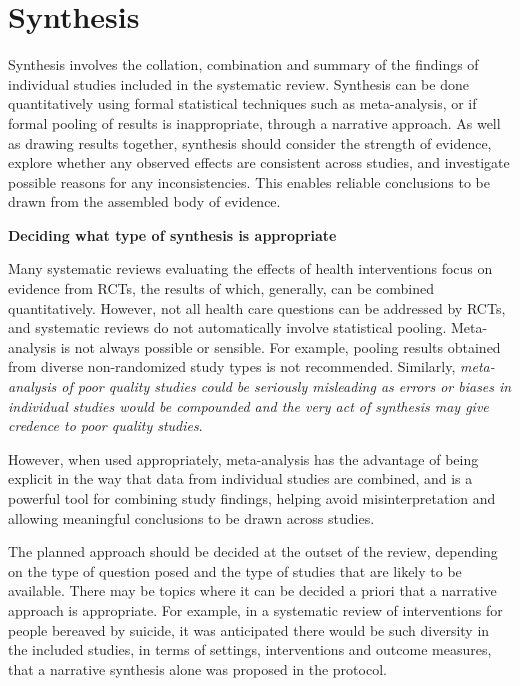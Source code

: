 \documentclass[
  11pt,
  a4paper,
  DIV=11,
  numbers=noendperiod]{scrreprt}
\begin{document}
\section{Synthesis}\label{synthesis-1}

Synthesis involves the collation, combination and summary of the
findings of individual studies included in the systematic review.
Synthesis can be done quantitatively using formal statistical techniques
such as meta-analysis, or if formal pooling of results is inappropriate,
through a narrative approach. As well as drawing results together,
synthesis should consider the strength of evidence, explore whether any
observed effects are consistent across studies, and investigate possible
reasons for any inconsistencies. This enables reliable conclusions to be
drawn from the assembled body of evidence.

\textbf{Deciding what type of synthesis is appropriate}

Many systematic reviews evaluating the effects of health interventions
focus on evidence from RCTs, the results of which, generally, can be
combined quantitatively. However, not all health care questions can be
addressed by RCTs, and systematic reviews do not automatically involve
statistical pooling. Meta-analysis is not always possible or sensible.
For example, pooling results obtained from diverse non-randomized study
types is not recommended. Similarly, \emph{meta-analysis of poor quality
studies could be seriously misleading as errors or biases in individual
studies would be compounded and the very act of synthesis may give
credence to poor quality studies}.

However, when used appropriately, meta-analysis has the advantage of
being explicit in the way that data from individual studies are
combined, and is a powerful tool for combining study findings, helping
avoid misinterpretation and allowing meaningful conclusions to be drawn
across studies.

The planned approach should be decided at the outset of the review,
depending on the type of question posed and the type of studies that are
likely to be available. There may be topics where it can be decided a
priori that a narrative approach is appropriate. For example, in a
systematic review of interventions for people bereaved by suicide, it
was anticipated there would be such diversity in the included studies,
in terms of settings, interventions and outcome measures, that a
narrative synthesis alone was proposed in the protocol.
\end{document}
